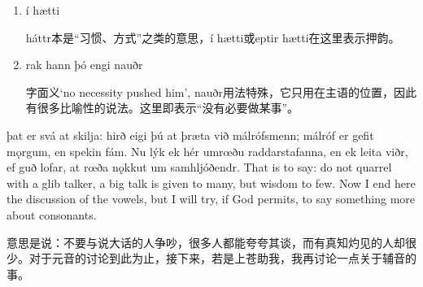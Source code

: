 \begin{grammar*}{}
    \begin{enumerate}[leftmargin=*]
        \item í hætti

              háttr本是“习惯、方式”之类的意思，í hætti或eptir hætti在这里表示押韵。

        \item rak hann þó engi nauðr

              字面义`no necessity pushed him', nauðr用法特殊，它只用在主语的位置，因此有很多比喻性的说法。这里即表示“没有必要做某事”。
    \end{enumerate}
\end{grammar*}
\begin{paracol}{2}
    þat er svá at skilja: hirð eigi þú at þræta við málrófsmenn; málróf er gefit mǫrgum, en spekin fám. Nu lýk ek hér umrœðu raddarstafanna, en ek leita viðr, ef guð lofar, at rœða nǫkkut um samhljóðendr.
    \switchcolumn
    That is to say: do not quarrel with a glib talker, a big talk is given to many, but wisdom to few. Now I end here the discussion of the vowels, but I will try, if God permits, to say something more about consonants.
\end{paracol}
\begin{translation*}{}
    意思是说：不要与说大话的人争吵，很多人都能夸夸其谈，而有真知灼见的人却很少。对于元音的讨论到此为止，接下来，若是上苍助我，我再讨论一点关于辅音的事。
\end{translation*}

